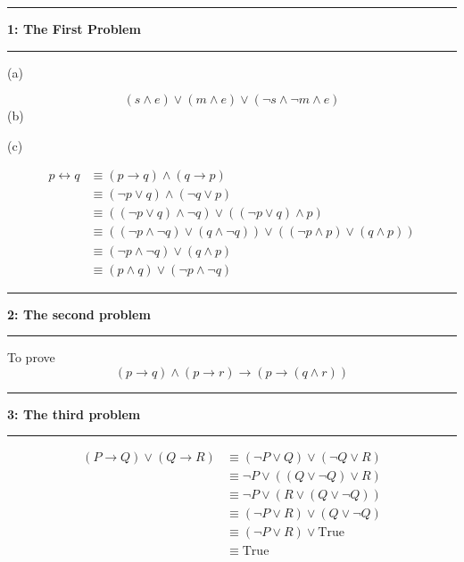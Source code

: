 \documentclass[11pt]{article}
\newcommand\question[2]{\vspace{.25in}\hrule\textbf{#1: #2}\vspace{.5em}\hrule\vspace{.10in}}
\begin{document}
\raggedright
\newcommand\NAME{Carl Kingsford}  %
\newcommand\ANDREWID{ckingsf}     %
\newcommand\HWNUM{1}              %


\question{1}{The First Problem} 
(a)

\[(s \land e)\lor(m \land e)\lor(\lnot s\land \lnot m\land e)\]
(b)

(c)

\begin{align*}
    p\leftrightarrow q &\equiv (p\to q)\land (q\to p) \\
                       &\equiv (\lnot p \lor q)\land (\lnot q \lor p) \\
                       &\equiv ((\lnot p \lor q)\land \lnot q)\lor((\lnot p \lor q)\land p)\\
                       &\equiv ((\lnot p\land \lnot q)\lor(q\land \lnot q)) \lor ((\lnot p \land p)\lor (q\land p))\\
                       &\equiv (\lnot p\land \lnot q) \lor (q\land p) \\ 
                       &\equiv (p \land q) \lor (\lnot p\land \lnot q)
\end{align*}


\question{2}{The second problem}
To prove \[(p\to q)\land (p\to r)\to (p \to (q\land r))\]

\question{3}{The third problem}
\begin{align*}
    (P\to Q) \lor (Q \to R) &\equiv (\lnot P \lor Q) \lor (\lnot Q \lor R) \\ 
                            &\equiv \lnot P\lor ((Q\lor \lnot Q)\lor R) \\
                            &\equiv \lnot P\lor (R\lor (Q\lor \lnot Q)) \\
                            &\equiv (\lnot P\lor R)\lor (Q \lor\lnot Q) \\
                            &\equiv (\lnot P\lor R) \lor \mathrm{True}\\
                            &\equiv \mathrm{True}
\end{align*}
\end{document}
